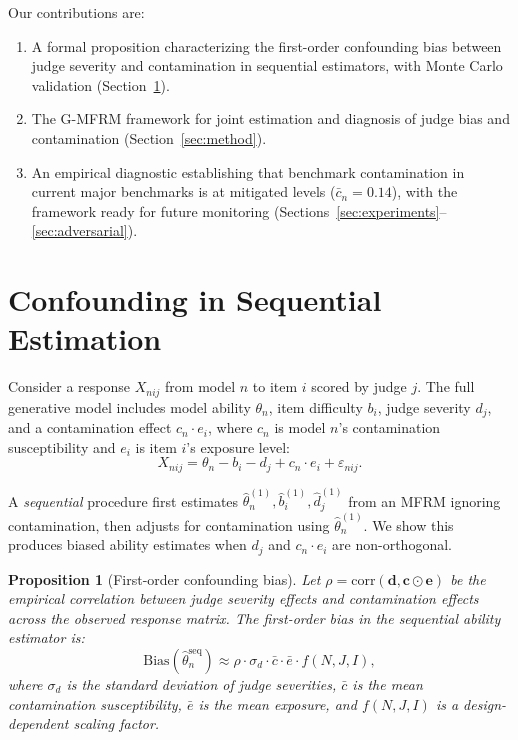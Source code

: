 \documentclass[11pt]{article}
\newtheorem{proposition}{Proposition}
\begin{document}
Our contributions are:
\begin{enumerate}
    \item A formal proposition characterizing the first-order confounding bias between judge severity and contamination in sequential estimators, with Monte Carlo validation (Section~\ref{sec:confounding}).
    \item The G-MFRM framework for joint estimation and diagnosis of judge bias and contamination (Section~\ref{sec:method}).
    \item An empirical diagnostic establishing that benchmark contamination in current major benchmarks is at mitigated levels ($\bar{c}_n = 0.14$), with the framework ready for future monitoring (Sections~\ref{sec:experiments}--\ref{sec:adversarial}).
\end{enumerate}

\section{Confounding in Sequential Estimation}
\label{sec:confounding}

Consider a response $X_{nij}$ from model $n$ to item $i$ scored by judge $j$. The full generative model includes model ability $\theta_n$, item difficulty $b_i$, judge severity $d_j$, and a contamination effect $c_n \cdot e_i$, where $c_n$ is model $n$'s contamination susceptibility and $e_i$ is item $i$'s exposure level:
\begin{equation}
    X_{nij} = \theta_n - b_i - d_j + c_n \cdot e_i + \varepsilon_{nij}.
    \label{eq:full}
\end{equation}

A \emph{sequential} procedure first estimates $\hat{\theta}_n^{(1)}, \hat{b}_i^{(1)}, \hat{d}_j^{(1)}$ from an MFRM ignoring contamination, then adjusts for contamination using $\hat{\theta}_n^{(1)}$. We show this produces biased ability estimates when $d_j$ and $c_n \cdot e_i$ are non-orthogonal.

\begin{proposition}[First-order confounding bias]
\label{prop:bias}
Let $\rho = \text{corr}(\mathbf{d}, \mathbf{c} \odot \mathbf{e})$ be the empirical correlation between judge severity effects and contamination effects across the observed response matrix. The first-order bias in the sequential ability estimator is:
\begin{equation}
    \text{Bias}(\hat{\theta}_n^{\text{seq}}) \approx \rho \cdot \sigma_d \cdot \bar{c} \cdot \bar{e} \cdot f(N, J, I),
    \label{eq:bias}
\end{equation}
where $\sigma_d$ is the standard deviation of judge severities, $\bar{c}$ is the mean contamination susceptibility, $\bar{e}$ is the mean exposure, and $f(N, J, I)$ is a design-dependent scaling factor.
\end{proposition}
\end{document}
